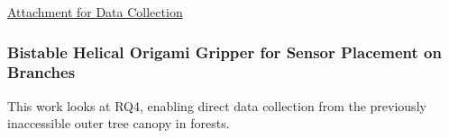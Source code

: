 \underline{Attachment for Data Collection}

\subsubsection{Bistable Helical Origami Gripper for Sensor Placement on Branches \cite{Geckeler2022a}}


This work looks at RQ4, enabling direct data collection from the previously inaccessible outer tree canopy in forests. 


